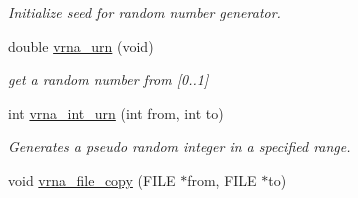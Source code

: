 \begin{DoxyCompactItemize}
\begin{DoxyCompactList}\small\item\em Initialize seed for random number generator. \end{DoxyCompactList}\item 
double \hyperlink{group__utils_ga384e256ebb295d04a14426179db0dd6e}{vrna\-\_\-urn} (void)
\begin{DoxyCompactList}\small\item\em get a random number from \mbox{[}0..1\mbox{]} \end{DoxyCompactList}\item 
int \hyperlink{group__utils_ga46111bb3747dbcf4609f0d40ae169ad9}{vrna\-\_\-int\-\_\-urn} (int from, int to)
\begin{DoxyCompactList}\small\item\em Generates a pseudo random integer in a specified range. \end{DoxyCompactList}\item 
\hypertarget{group__utils_ga4382a56d2fee9ed738364b99329edc7c}{void \hyperlink{group__utils_ga4382a56d2fee9ed738364b99329edc7c}{vrna\-\_\-file\-\_\-copy} (F\-I\-L\-E $\ast$from, F\-I\-L\-E $\ast$to)}\label{group__utils_ga4382a56d2fee9ed738364b99329edc7c}


\end{DoxyCompactItemize}
